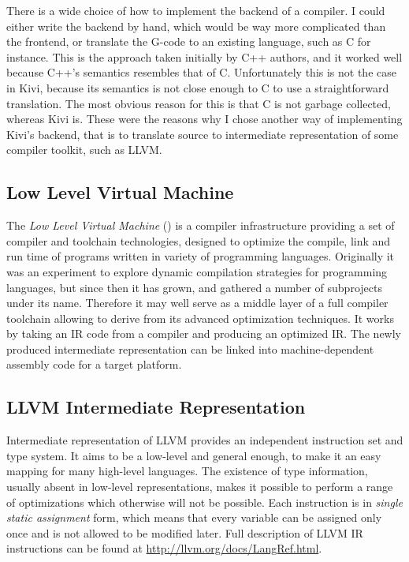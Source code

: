 \documentclass[12pt,a4paper]{report}
\begin{document}
There is a wide choice of how to implement the backend of a compiler. I could
either write the backend by hand, which would be way more complicated than the
frontend, or translate the G-code to an existing language, such as C for
instance. This is the approach taken initially by C++ authors, and it worked
well because C++'s semantics resembles that of C. Unfortunately this is not the
case in Kivi, because its semantics is not close enough to C to use a
straightforward translation. The most obvious reason for this is that C is not
garbage collected, whereas Kivi is. These were the reasons why I chose another
way of implementing Kivi's backend, that is to translate source to intermediate
representation of some compiler toolkit, such as LLVM.

\subsection{Low Level Virtual Machine}
The \textit{Low Level Virtual Machine} (\cite{website:llvm}) is a compiler
infrastructure providing a set of compiler and toolchain technologies, designed
to optimize the compile, link and run time of programs written in variety of
programming languages. Originally it was an experiment to explore dynamic
compilation strategies for programming languages, but since then it has grown,
and gathered a number of subprojects under its name. Therefore it may well
serve as a middle layer of a full compiler toolchain allowing to derive from
its advanced optimization techniques. It works by taking an IR code from a
compiler and producing an optimized IR. The newly produced intermediate
representation can be linked into machine-dependent assembly code for a target
platform.

\subsection{LLVM Intermediate Representation}
Intermediate representation of LLVM provides an independent instruction set and
type system. It aims to be a low-level and general enough, to make it an easy
mapping for many high-level languages. The existence of type information,
usually absent in low-level representations, makes it possible to perform a
range of optimizations which otherwise will not be possible. Each instruction is
in \textit{single static assignment} form, which means that every variable can
be assigned only once and is not allowed to be modified later. Full description
of LLVM IR instructions can be found at \url{http://llvm.org/docs/LangRef.html}.
\end{document}
